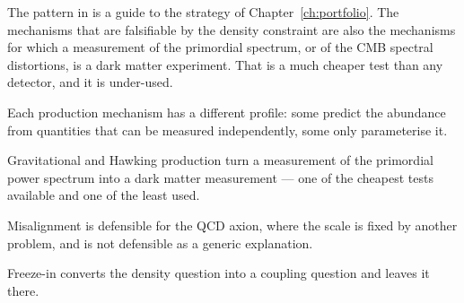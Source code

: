 The pattern in  is a guide to the strategy of
Chapter~\ref{ch:portfolio}. The mechanisms that are falsifiable by the
density constraint are also the mechanisms for which a measurement of the
primordial spectrum, or of the CMB spectral distortions, is a dark matter
experiment. That is a much cheaper test than any detector, and it is
under-used.

\begin{keytakeaways}
\item Each production mechanism has a different profile: some predict the
abundance from quantities that can be measured independently, some only
parameterise it.
\item Gravitational and Hawking production turn a measurement of the
primordial power spectrum into a dark matter measurement --- one of the
cheapest tests available and one of the least used.
\item Misalignment is defensible for the QCD axion, where the scale is fixed
by another problem, and is not defensible as a generic explanation.
\item Freeze-in converts the density question into a coupling question and
leaves it there.
\end{keytakeaways}
